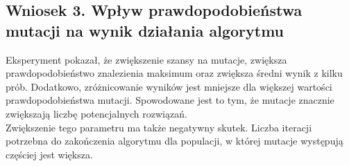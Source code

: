 \documentclass[a4paper,11pt]{article}
\begin{document}
		\subsection{Wniosek 3. Wpływ prawdopodobieństwa mutacji na wynik działania algorytmu}
		Eksperyment pokazał, że zwiększenie szansy na mutacje, zwiększa prawdopodobieństwo znalezienia maksimum oraz zwiększa średni wynik z kilku prób. Dodatkowo, zróżnicowanie wyników jest mniejsze dla większej wartości prawdopodobieństwa mutacji. Spowodowane jest to tym, że mutacje znacznie zwiększają liczbę potencjalnych rozwiązań.\\
		Zwiększenie tego parametru ma także negatywny skutek. Liczba iteracji potrzebna do zakończenia algorytmu dla populacji, w której mutacje występują częściej jest większa.
		
	
\end{document}
